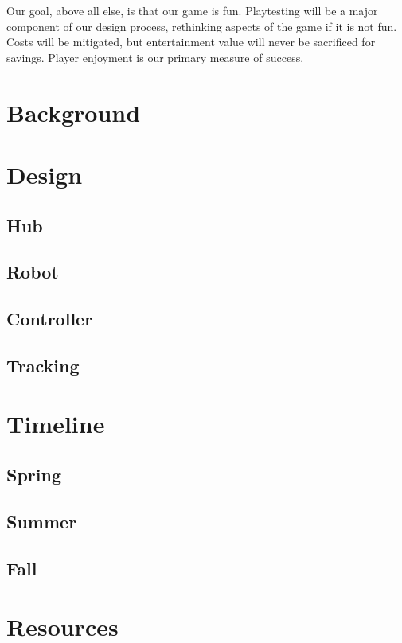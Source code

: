 \documentclass[11pt]{ieeeconf}
\begin{document}
Our goal, above all else, is that our game is fun. Playtesting will be a major component of our design process, rethinking aspects of the game if it is not fun. Costs will be mitigated, but entertainment value will never be sacrificed for savings. Player enjoyment is our primary measure of success.


\section{Background}

\section{Design}


\subsection{Hub}

\subsection{Robot}

\subsection{Controller}

\subsection{Tracking}

\section{Timeline}

\subsection{Spring}

\subsection{Summer}

\subsection{Fall}

\section{Resources}
\end{document}
